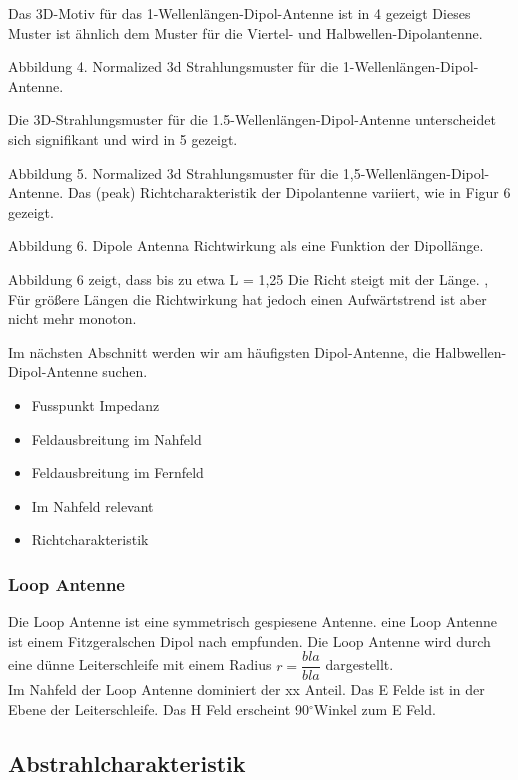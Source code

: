 Das 3D-Motiv für das 1-Wellenlängen-Dipol-Antenne ist in 4 gezeigt Dieses Muster ist ähnlich dem Muster für die Viertel- und Halbwellen-Dipolantenne.


Abbildung 4. Normalized 3d Strahlungsmuster für die 1-Wellenlängen-Dipol-Antenne.

Die 3D-Strahlungsmuster für die 1.5-Wellenlängen-Dipol-Antenne unterscheidet sich signifikant und wird in 5 gezeigt.


Abbildung 5. Normalized 3d Strahlungsmuster für die 1,5-Wellenlängen-Dipol-Antenne.
Das (peak) Richtcharakteristik der Dipolantenne variiert, wie in Figur 6 gezeigt.


Abbildung 6. Dipole Antenna Richtwirkung als eine Funktion der Dipollänge.

Abbildung 6 zeigt, dass bis zu etwa L = 1,25 Die Richt steigt mit der Länge. , Für größere Längen die Richtwirkung hat jedoch einen Aufwärtstrend ist aber nicht mehr monoton.

Im nächsten Abschnitt werden wir am häufigsten Dipol-Antenne, die Halbwellen-Dipol-Antenne suchen.
\begin{itemize}
\item Fusspunkt Impedanz
\item Feldausbreitung im Nahfeld
\item Feldausbreitung im Fernfeld
\item Im Nahfeld relevant
\item Richtcharakteristik
\end{itemize}
\subsubsection{Loop Antenne}
Die Loop Antenne ist eine symmetrisch gespiesene Antenne. eine Loop Antenne ist einem Fitzgeralschen Dipol nach empfunden. Die Loop Antenne wird durch eine dünne Leiterschleife mit einem Radius  $r=\dfrac{bla}{bla}$  dargestellt. \\
Im Nahfeld der Loop Antenne dominiert der xx Anteil. Das E Felde ist in der Ebene der Leiterschleife. Das H Feld erscheint 90$^\circ$Winkel zum E Feld. 
\subsection{Abstrahlcharakteristik}
